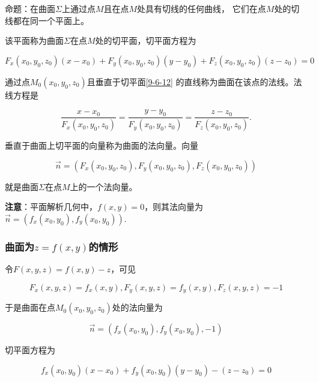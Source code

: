 \documentclass[12pt, a4paper]{article}
\numberwithin{equation}{section}
\begin{document}
    命题：在曲面\(\Sigma\)上通过点\(M\)且在点\(M\)处具有切线的任何曲线，
    它们在点\(M\)处的切线都在同一个平面上。

    该平面称为曲面\(\Sigma\)在点\(M\)处的切平面，切平面方程为

    \begin{equation}
        F_x\left(x_0, y_0, z_0\right)\left(x-x_0\right)+F_y\left(x_0, y_0, z_0\right)\left(y-y_0\right)+
        F_z\left(x_0, y_0, z_0\right)\left(z-z_0\right)=0
        \label{9-6-12}
    \end{equation}

    通过点\(M_0\left(x_0,y_0,z_0\right)\)且垂直于切平面\ref{9-6-12}
    的直线称为曲面在该点的法线。法线方程是

    \begin{equation}
        \frac{x-x_0}{F_x\left(x_0, y_0, z_0\right)}=\frac{y-y_0}{F_y\left(x_0, y_0, z_0\right)}=\frac{z-z_0}{F_z\left(x_0, y_0, z_0\right)} .
    \end{equation}

    垂直于曲面上切平面的向量称为曲面的法向量。向量

    \begin{equation}
        \overrightarrow{n}=\left(F_x\left(x_0, y_0, z_0\right), F_y\left(x_0, y_0, z_0\right), F_z\left(x_0, y_0, z_0\right)\right)
    \end{equation}

    就是曲面\(\Sigma\)在点\(M\)上的一个法向量。

    \textbf{注意}：平面解析几何中，\(f\left(x,y\right)=0\)，则其法向量为$\overrightarrow{n}=
    \left(f_x\left(x_0, y_0\right), f_y\left(x_0, y_0\right)\right)$.

\subsubsection{曲面为\(z=f\left(x,y\right)\)的情形}

    令\(F\left(x,y,z\right)=f\left(x,y\right)-z\)，可见

    $$
        F_x(x, y, z)=f_x(x, y), F_y(x, y, z)=f_y(x, y), F_z(x, y, z)=-1
    $$

    于是曲面在点\(M_0\left(x_0,y_0,z_0\right)\)处的法向量为

    $$
        \overrightarrow{n}=\left(f_x\left(x_0, y_0\right), f_y\left(x_0, y_0\right),-1\right)
    $$

    切平面方程为

    \begin{equation}
        f_x\left(x_0, y_0\right)\left(x-x_0\right)+f_y\left(x_0, y_0\right)\left(y-y_0\right)-\left(z-z_0\right)=0
    \end{equation}
\end{document}

